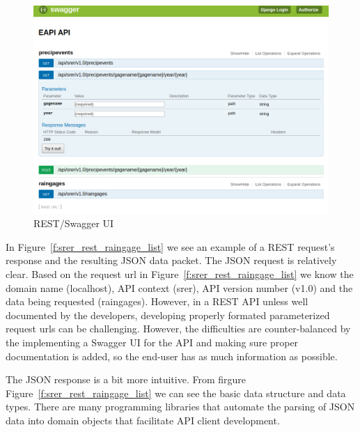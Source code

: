 \begin{figure}[htb]
  \centering\includegraphics[width=\columnwidth]{./images/rest_swagger_ui.png}
  \caption{REST/Swagger UI}\label{f:rest_swagger_ui}
\end{figure}

In Figure~\ref{f:srer_rest_raingage_list} we see an example of a REST 
request's response and the resulting JSON data packet.  The JSON request is 
relatively clear.  Based on the request url in 
Figure~\ref{f:srer_rest_raingage_list} we know the domain name (localhost), 
API context (srer), API version number (v1.0) and the data being requested 
(raingages).  However, in a REST API unless well documented by the developers, 
developing properly formated parameterized request urls can be challenging.  
However, the difficulties are counter-balanced by the implementing a Swagger 
UI for the API and making sure proper documentation is added, so the end-user 
has as much information as possible.

The JSON response is a bit more intuitive.  From firgure 
Figure~\ref{f:srer_rest_raingage_list} we can see the basic data structure and 
data types.  There are many programming libraries that automate the parsing of 
JSON data into domain objects that facilitate API client development.

